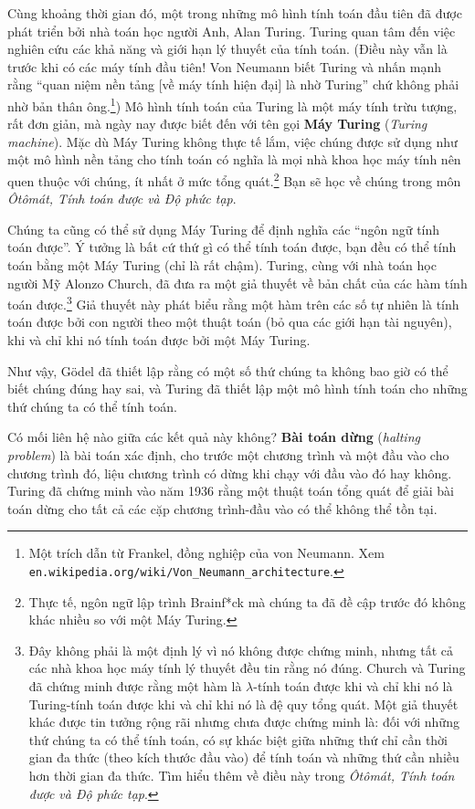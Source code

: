 Cùng khoảng thời gian đó, một trong những mô hình tính toán đầu tiên đã được phát triển bởi nhà toán học người Anh, Alan Turing. Turing quan tâm đến việc nghiên cứu các khả năng và giới hạn lý thuyết của tính toán. (Điều này vẫn là trước khi có các máy tính đầu tiên! Von Neumann biết Turing và nhấn mạnh rằng ``quan niệm nền tảng [về máy tính hiện đại] là nhờ Turing'' chứ không phải nhờ bản thân ông.\footnote{Một trích dẫn từ Frankel, đồng nghiệp của von Neumann. Xem \texttt{en.wikipedia.org/wiki/Von\_Neumann\_architecture}.}) Mô hình tính toán của Turing là một máy tính trừu tượng, rất đơn giản, mà ngày nay được biết đến với tên gọi \textbf{Máy Turing} (\textit{Turing machine}). Mặc dù Máy Turing không thực tế lắm, việc chúng được sử dụng như một mô hình nền tảng cho tính toán có nghĩa là mọi nhà khoa học máy tính nên quen thuộc với chúng, ít nhất ở mức tổng quát.\footnote{Thực tế, ngôn ngữ lập trình Brainf*ck mà chúng ta đã đề cập trước đó không khác nhiều so với một Máy Turing.} Bạn sẽ học về chúng trong môn \textit{Ôtômát, Tính toán được và Độ phức tạp}.

Chúng ta cũng có thể sử dụng Máy Turing để định nghĩa các ``ngôn ngữ tính toán được''. Ý tưởng là bất cứ thứ gì có thể tính toán được, bạn đều có thể tính toán bằng một Máy Turing (chỉ là rất chậm). Turing, cùng với nhà toán học người Mỹ Alonzo Church, đã đưa ra một giả thuyết về bản chất của các hàm tính toán được.\footnote{Đây không phải là một định lý vì nó không được chứng minh, nhưng tất cả các nhà khoa học máy tính lý thuyết đều tin rằng nó đúng. Church và Turing đã chứng minh được rằng một hàm là $\lambda$-tính toán được khi và chỉ khi nó là Turing-tính toán được khi và chỉ khi nó là đệ quy tổng quát. Một giả thuyết khác được tin tưởng rộng rãi nhưng chưa được chứng minh là: đối với những thứ chúng ta có thể tính toán, có sự khác biệt giữa những thứ chỉ cần thời gian đa thức (theo kích thước đầu vào) để tính toán và những thứ cần nhiều hơn thời gian đa thức. Tìm hiểu thêm về điều này trong \textit{Ôtômát, Tính toán được và Độ phức tạp}.} Giả thuyết này phát biểu rằng một hàm trên các số tự nhiên là tính toán được bởi con người theo một thuật toán (bỏ qua các giới hạn tài nguyên), khi và chỉ khi nó tính toán được bởi một Máy Turing.

Như vậy, Gödel đã thiết lập rằng có một số thứ chúng ta không bao giờ có thể biết chúng đúng hay sai, và Turing đã thiết lập một mô hình tính toán cho những thứ chúng ta có thể tính toán.

Có mối liên hệ nào giữa các kết quả này không? \textbf{Bài toán dừng} (\textit{halting problem}) là bài toán xác định, cho trước một chương trình và một đầu vào cho chương trình đó, liệu chương trình có dừng khi chạy với đầu vào đó hay không. Turing đã chứng minh vào năm 1936 rằng một thuật toán tổng quát để giải bài toán dừng cho tất cả các cặp chương trình-đầu vào có thể không thể tồn tại.

